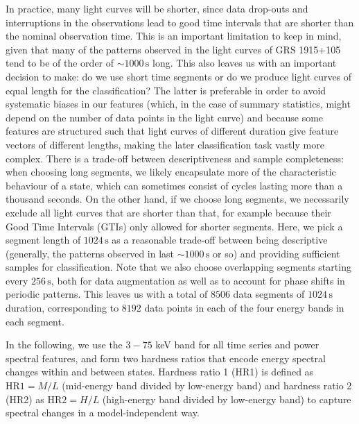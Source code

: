 \documentclass[12pt]{emulateapj}
\begin{document}
In practice, many light curves will be shorter, since data drop-outs and interruptions in the observations lead to good time intervals that are shorter than the nominal observation time. This is an important limitation to keep in mind, given that many of the patterns observed in the light curves of GRS 1915+105 tend to be of the order of $\sim\! 1000 \,\mathrm{s}$ long.  This also leaves us with an important decision to make: do we use short time segments or do we produce light curves of equal length for the classification? The latter is preferable in order to avoid systematic biases in our features (which, in the case of summary statistics, might depend on the number of data points in the light curve) and because some features are structured such that light curves of different duration give feature vectors of different lengths, making the later classification task vastly more complex. There is a trade-off between descriptiveness and sample completeness: when choosing long segments, we likely encapsulate more of the characteristic behaviour of a state, which can sometimes consist of cycles lasting more than a thousand seconds. On the other hand, if we choose long segments, we necessarily exclude all light curves that are shorter than that, for example because their Good Time Intervals (GTIs) only allowed for shorter segments. Here, we pick a segment length of $1024\,\mathrm{s}$ as a reasonable trade-off between being descriptive (generally, the patterns observed in \citet{belloni2000} last $\sim\!1000\,\mathrm{s}$ or so) and providing sufficient samples for classification. Note that we also choose overlapping segments starting every $256\,\mathrm{s}$, both for data augmentation as well as to account for phase shifts in periodic patterns. This leaves us with a total of $8506$ data segments of $1024\,\mathrm{s}$ duration, corresponding to $8192$ data points in each of the four energy bands in each segment. 

In the following, we use the $3 - 75$ keV band for all time series and power spectral features, and form two hardness ratios that encode energy spectral changes within and between states. Hardness ratio 1 (HR1) is defined as $\mathrm{HR}1 = M/L$ (mid-energy band divided by low-energy band) and hardness ratio 2 (HR2) as $\mathrm{HR}2 = H/L$ (high-energy band divided by low-energy band) to capture spectral changes in a model-independent way.



%
%
%
%
\end{document}
